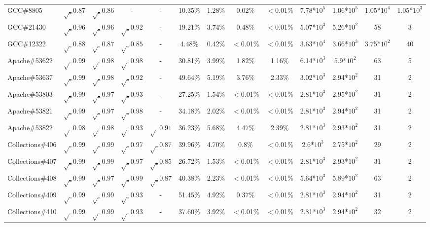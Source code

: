 \begin{table}[h!]
\begin{tabular}{lcccccccccccc}
    GCC\#8805         & $\surd_{0.87}$ & $\surd_{0.86}$ & - & - & 10.35\% & 1.28\% & 0.02\% & $<$0.01\% & 7.78*${10^5}$ & 1.06*${10^5}$ & 1.05*$10^{4}$ & 1.05*$10^{3}$ \\
    GCC\#21430        & $\surd_{0.96}$ & $\surd_{0.96}$ & $\surd_{0.92}$ & - & 19.21\% & 3.74\% & 0.48\% & $<$0.01\% & 5.07*${10^3}$ & 5.26*${10^2}$ & 58 & 3 \\
    GCC\#12322        & $\surd_{0.88}$ & $\surd_{0.87}$ & $\surd_{0.85}$ & - & 4.48\% & 0.42\% & $<$0.01\% & $<$0.01\% & 3.63*${10^4}$ & 3.66*${10^3}$ & 3.75*${10^2}$ & 40 \\
    \midrule
    \midrule
    Apache\#53622     & $\surd_{0.99}$ & $\surd_{0.98}$ & $\surd_{0.98}$ & - & 30.81\% & 3.99\% & 1.82\% & 1.16\% & 6.14*${10^3}$ & 5.9*${10^2}$ & 63 & 5 \\
    Apache\#53637     & $\surd_{0.99}$ & $\surd_{0.98}$ & $\surd_{0.92}$ & - & 49.64\% & 5.19\% & 3.76\% & 2.33\% & 3.02*${10^3}$ & 2.94*${10^2}$ & 31 & 2 \\
    Apache\#53803     & $\surd_{0.99}$ & $\surd_{0.97}$ & $\surd_{0.93}$ & - & 27.25\% & 1.54\% & $<$0.01\% & $<$0.01\% & 2.81*${10^3}$ & 2.95*${10^2}$ & 31 & 2 \\
    Apache\#53821     & $\surd_{0.99}$ & $\surd_{0.97}$ & $\surd_{0.98}$ & - & 34.18\% & 2.02\% & $<$0.01\% & $<$0.01\% & 2.81*${10^3}$ & 2.94*${10^2}$ & 31 & 2 \\
    Apache\#53822     & $\surd_{0.98}$ & $\surd_{0.98}$ & $\surd_{0.93}$ & $\surd_{0.91}$ & 36.23\% & 5.68\% & 4.47\% & 2.39\% & 2.81*${10^3}$ & 2.93*${10^2}$ & 31 & 2 \\
    \midrule
    Collections\#406   & $\surd_{0.99}$ & $\surd_{0.99}$ & $\surd_{0.97}$ & $\surd_{0.87}$ & 39.96\% & 4.70\% & 0.8\% & $<$0.01\% & 2.6*${10^3}$ & 2.75*${10^2}$ & 29 & 2 \\
    Collections\#407   & $\surd_{0.99}$ & $\surd_{0.99}$ & $\surd_{0.97}$ & $\surd_{0.85}$ & 26.72\% & 1.53\% & $<$0.01\% & $<$0.01\% & 2.81*${10^3}$ & 2.93*${10^2}$ & 31 & 2 \\
    Collections\#408   & $\surd_{0.99}$ & $\surd_{0.97}$ & $\surd_{0.99}$ & $\surd_{0.87}$ & 40.38\% & 2.23\% & $<$0.01\% & $<$0.01\% & 5.64*${10^3}$ & 5.89*${10^2}$ & 63 & 2 \\
    Collections\#409   & $\surd_{0.99}$ & $\surd_{0.99}$ & $\surd_{0.93}$ & - & 51.45\% & 4.92\% & 0.37\% & $<$0.01\% & 2.81*${10^3}$ & 2.94*${10^2}$ & 31 & 2 \\
    Collections\#410   & $\surd_{0.99}$ & $\surd_{0.99}$ & $\surd_{0.93}$ & - & 37.60\% & 3.92\% & $<$0.01\% & $<$0.01\% & 2.81*${10^3}$ & 2.94*${10^2}$ & 32 & 2 \\

\end{tabular}
\end{table}
